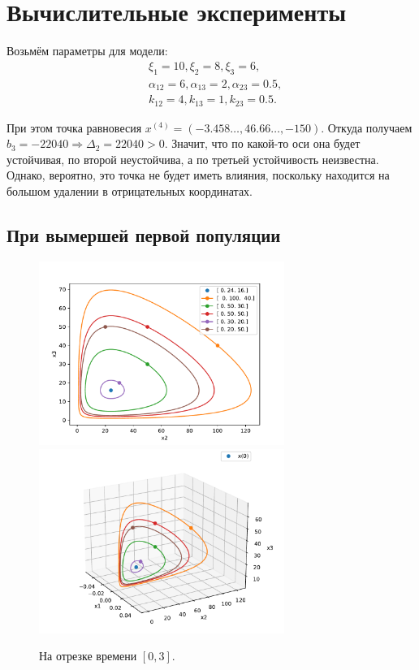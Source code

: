 \section{Вычислительные эксперименты}
    Возьмём параметры для модели:
    \[
        \begin{split}
            & \xi_1 = 10, \xi_2 = 8, \xi_3 = 6, \\
            & \alpha_{12} = 6, \alpha_{13} = 2, \alpha_{23} = 0.5, \\
            & k_{12} = 4, k_{13} = 1, k_{23} = 0.5.
        \end{split}
    \]

    При этом точка равновесия \( x^{(4)} = ( -3.458\dots, 46.66\dots, -150 ) \). Откуда получаем \( b_3 = -22040 \Rightarrow \Delta_2 = 22040 > 0 \). Значит, что по какой-то оси она будет устойчивая, по второй неустойчива, а по третьей устойчивость неизвестна. Однако, вероятно, это точка не будет иметь влияния, поскольку находится на большом удалении в отрицательных координатах.

    \subsection{При вымершей первой популяции}

    \begin{figure}[H]
        
        \includegraphics[width=8cm]{pictures/x1_0phase.pdf}
        \includegraphics[width=8cm]{pictures/x1_0phase3.pdf}
        \caption{На отрезке времени \( [0, 3] \).}
    \end{figure}


